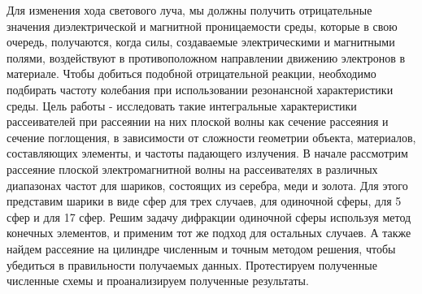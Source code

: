 Для изменения хода светового луча, мы должны получить отрицательные значения диэлектрической и магнитной проницаемости среды, которые в свою очередь, получаются, когда силы, создаваемые электрическими и магнитными полями, воздействуют в противоположном направлении движению электронов в материале. Чтобы добиться подобной отрицательной реакции, необходимо подбирать частоту колебания при использовании резонансной характеристики среды.
Цель работы - исследовать такие интегральные характеристики рассеивателей при рассеянии на них плоской волны как сечение рассеяния и сечение поглощения, в зависимости от сложности геометрии объекта, материалов, составляющих элементы, и частоты падающего излучения.
В начале рассмотрим рассеяние плоской электромагнитной волны на рассеивателях в различных диапазонах частот для шариков, состоящих из серебра, меди и золота. Для этого представим шарики в виде сфер для трех случаев, для одиночной сферы, для 5 сфер и для 17 сфер. Решим задачу дифракции одиночной сферы используя метод конечных элементов, и применим тот же подход для остальных случаев. А также найдем рассеяние на цилиндре численным и точным методом решения, чтобы убедиться в правильности получаемых данных. Протестируем полученные численные схемы и проанализируем полученные результаты.
